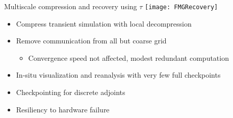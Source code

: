 \begin{frame}{Multiscale compression and recovery using $\tau$}
  \texttt{[image: FMGRecovery]}
    \begin{itemize}
    \item Compress transient simulation with local decompression
    \item Remove communication from all but coarse grid
      \begin{itemize}
      \item Convergence speed not affected, modest redundant computation
      \end{itemize}
    \item In-situ visualization and reanalysis with very few full checkpoints
    \item Checkpointing for discrete adjoints
    \item Resiliency to hardware failure
    \end{itemize}
\end{frame}
